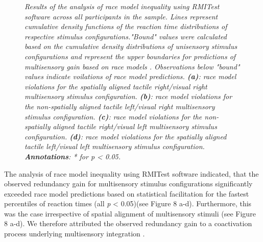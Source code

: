 \documentclass[12pt]{article}
\begin{document}
\begin{figure}[t!]
\begin{subfigure}[b]{0.475\textwidth}
            \caption[]%
            {{\small}}    
            \label{fig:6d}
        \end{subfigure}
        \caption[]%
        {\textit{\footnotesize{Results of the analysis of race model inequality using RMITest software \parencite{ulrich_testing_2007} across all participants in the sample. Lines represent cumulative density functions of the reaction time distributions of respective stimulus configurations."Bound" values were calculated based on the cumulative density distributions of unisensory stimulus configurations and represent the upper boundaries for predictions of multisensory gain based on race models \parencite{miller_divided_1982,ulrich_testing_2007}. Observations below "bound" values indicate voilations of race model predictions. \textbf{(a)}: race model violations for the spatially aligned tactile right/visual right multisensory stimulus configuration. \textbf{(b)}: race model violations for the non-spatially aligned tactile left/visual right multisensory stimulus configuration. \textbf{(c)}: race model violations for the non-spatially aligned tactile right/visual left multisensory stimulus configuration. \textbf{(d)}: race model violations for the spatially aligned tactile left/visual left multisensory stimulus configuration. \textbf{Annotations}: * for \textit{p} < 0.05.}}} 
        \label{fig:6}
\end{figure}
%
\par The analysis of race model inequality using RMITest software \parencite{ulrich_testing_2007} indicated, that the observed redundancy gain for multisensory stimulus configurations significantly exceeded race model predictions based on statistical facilitation for the fastest percentiles of reaction times (all \textit{p} < 0.05)\parencite{miller_divided_1982, ulrich_testing_2007}(see Figure 8 a-d). Furthermore, this was the case irrespective of spatial alignment of multisensory stimuli (see Figure 8 a-d). We therefore attributed the observed redundancy gain to a coactivation process underlying multisensory integration \parencite{miller_divided_1982,miller_timecourse_1986}.
\end{document}
